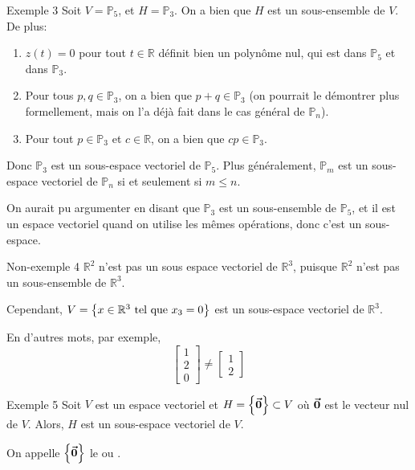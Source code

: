 \documentclass[a4paper]{article}
\begin{document}
\begin{parag}{Exemple 3}
    Soit $V = \mathbb{P}_5$, et $H = \mathbb{P}_3$. On a bien que $H$ est un sous-ensemble de $V$. De plus:
    \begin{enumerate}
        \item $z\left(t\right) = 0$ pour tout $t \in \mathbb{R}$ définit bien un polynôme nul, qui est dans $\mathbb{P}_5$ et dans $\mathbb{P}_3$.
        \item Pour tous $p, q \in \mathbb{P}_3$, on a bien que $p + q \in \mathbb{P}_3$ (on pourrait le démontrer plus formellement, mais on l'a déjà fait dans le cas général de $\mathbb{P}_n$).
        \item Pour tout $p \in \mathbb{P}_3$ et $c \in \mathbb{R}$, on a bien que $cp \in \mathbb{P}_3$.
    \end{enumerate}

Donc $\mathbb{P}_3$ est un sous-espace vectoriel de $\mathbb{P}_5$. Plus généralement, $\mathbb{P}_m$ est un sous-espace vectoriel de $\mathbb{P}_n$ si et seulement si $m \leq n$.

On aurait pu argumenter en disant que $\mathbb{P}_3$ est un sous-ensemble de $\mathbb{P}_5$, et il est un espace vectoriel quand on utilise les mêmes opérations, donc c'est un sous-espace.
\end{parag}

\begin{parag}{Non-exemple 4}
    $\mathbb{R}^{2}$ n'est pas un sous espace vectoriel de $\mathbb{R}^{3}$, puisque $\mathbb{R}^2$ n'est pas un sous-ensemble de $\mathbb{R}^3$.

    Cependant, $V = \left\{x \in \mathbb{R}^3 \telque x_3 = 0\right\}$ est un sous-espace vectoriel de $\mathbb{R}^3$.

    En d'autres mots, par exemple,
    \[\begin{bmatrix} 1 \\ 2 \\ 0 \end{bmatrix} \neq \begin{bmatrix} 1 \\ 2 \end{bmatrix} \]

\end{parag}

\begin{parag}{Exemple 5}
    Soit $V$ est un espace vectoriel et $H = \left\{\bvec{0}\right\} \subset V$ où $\bm{\protect\vec{0}}$ est le vecteur nul de $V$. Alors, $H$ est un sous-espace vectoriel de $V$.

    On appelle $\left\{\bvec{0}\right\}$ le  ou .
\end{parag}
\end{document}
